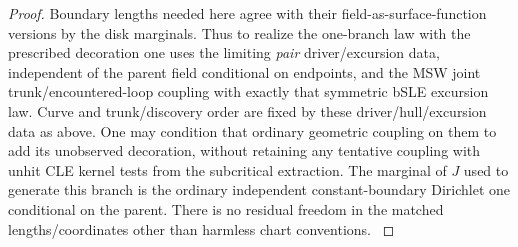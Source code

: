 \begin{proof}
Boundary lengths needed here agree with their field-as-surface-function versions by the disk marginals.
Thus to realize the one-branch law with the prescribed decoration one uses the limiting \emph{pair} driver/excursion data, independent of the parent field conditional on endpoints, and the MSW joint trunk/encountered-loop coupling with exactly that symmetric bSLE excursion law.
Curve and trunk/discovery order are fixed by these driver/hull/excursion data as above.
One may condition that ordinary geometric coupling on them to add its unobserved decoration, without retaining any tentative coupling with unhit CLE kernel tests from the subcritical extraction.
The marginal of \(J\) used to generate this branch is the ordinary independent constant-boundary Dirichlet one conditional on the parent.
There is no residual freedom in the matched lengths/coordinates other than harmless chart conventions. \citep[Proposition~5.3]{MSWTrunk}



\end{proof}
